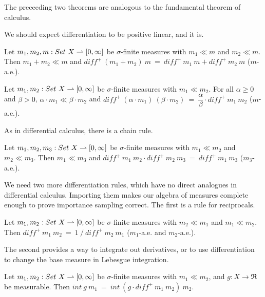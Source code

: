 The preceeding two theorems are analogous to the fundamental theorem of calculus.

We should expect differentiation to be positive linear, and it is.

\begin{lemma}
\label{lem:diff-distributes-over-addition}
Let $m_1,m_2,m : Set~X \rightharpoonup [0,\infty]$ be $\sigma$-finite measures with $m_1 \ll m$ and $m_2 \ll m$.
Then $m_1 + m_2 \ll m$ and $diff^+~(m_1 + m_2)~m\ =\ diff^+~m_1~m + diff^+~m_2~m$ ($m$-a.e.).
\end{lemma}

\begin{lemma}
\label{lem:diff-distributes-over-scaling}
Let $m_1,m_2 : Set~X \rightharpoonup [0,\infty]$ be $\sigma$-finite measures with $m_1 \ll m_2$.
For all $\alpha \ge 0$ and $\beta > 0$, $\alpha \cdot m_1 \ll \beta \cdot m_2$ and $diff^+~(\alpha \cdot m_1)~(\beta \cdot m_2)\ =\ \dfrac{\alpha}{\beta} \cdot diff^+~m_1~m_2$ ($m$-a.e.).
\end{lemma}

As in differential calculus, there is a chain rule.

\begin{lemma}
\label{lem:diff-chain-rule}
Let $m_1,m_2,m_3 : Set~X \rightharpoonup [0,\infty]$ be $\sigma$-finite measures with $m_1 \ll m_2$ and $m_2 \ll m_3$.
Then $m_1 \ll m_3$ and $diff^+~m_1~m_2 \cdot diff^+~m_2~m_3\ =\ diff^+~m_1~m_3$ ($m_3$-a.e.).
\end{lemma}

We need two more differentiation rules, which have no direct analogues in differential calculus.
Importing them makes our algebra of measures complete enough to prove importance sampling correct.
The first is a rule for reciprocals.

\begin{lemma}
\label{lem:diff-reciprocal-rule}
Let $m_1,m_2 : Set~X \rightharpoonup [0,\infty]$ be $\sigma$-finite measures with $m_2 \ll m_1$ and $m_1 \ll m_2$.
Then $diff^+~m_1~m_2\ =\ 1~{/}~diff^+~m_2~m_1$ ($m_1$-a.e. and $m_2$-a.e.).
\end{lemma}

The second provides a way to integrate out derivatives, or to use differentiation to change the base measure in Lebesgue integration.

\begin{lemma}
\label{lem:diff-change-measure}
Let $m_1,m_2 : Set~X \rightharpoonup [0,\infty]$ be $\sigma$-finite measures with $m_1 \ll m_2$, and $g : X \to \Re$ be measurable.
Then $int~g~m_1\ =\ int~(g \cdot diff^+~m_1~m_2)~m_2$.
\end{lemma}

